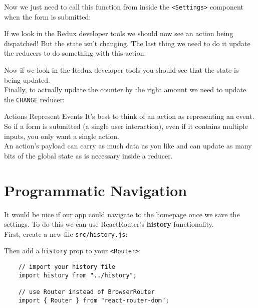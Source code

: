 
Now we just need to call this function from inside the \texttt{<Settings>} component when the form is submitted:


If we look in the Redux developer tools we should now see an action being dispatched! But the state isn't changing. The last thing we need to do it update the reducers to do something with this action:


Now if we look in the Redux developer tools you should see that the state is being updated.
\\

Finally, to actually update the counter by the right amount we need to update the \texttt{CHANGE} reducer:



\begin{infobox}{Actions Represent Events}
    It's best to think of an action as representing an event. So if a form is submitted (a single user interaction), even if it contains multiple inputs, you only want a single action.
    \\

    An action's payload can carry as much data as you like and can update as many bits of the global state as is necessary inside a reducer.
\end{infobox}



\section{Programmatic Navigation}

It would be nice if our app could navigate to the homepage once we save the settings. To do this we can use ReactRouter's \textbf{history} functionality.
\\

First, create a new file \texttt{src/history.js}:


Then add a \texttt{history} prop to your \texttt{<Router>}:

\begin{verbatim}
    // import your history file
    import history from "../history";

    // use Router instead of BrowserRouter
    import { Router } from "react-router-dom";
\end{verbatim}

